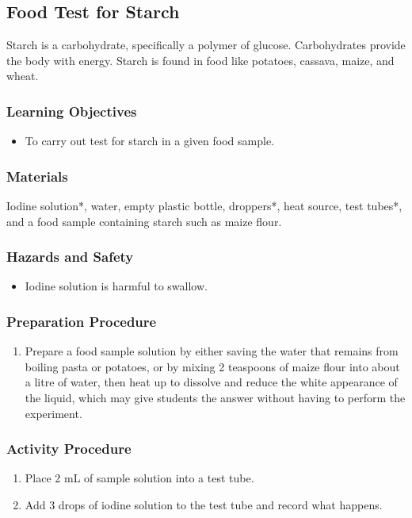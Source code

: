 \subsection{Food Test for Starch}
Starch is a carbohydrate, specifically a polymer of glucose. Carbohydrates provide the body with energy. Starch is found in food like potatoes, cassava, maize, and wheat.

\subsubsection*{Learning Objectives}
\begin{itemize}
\item{To carry out test for starch in a given food sample.}
\end{itemize}

\subsubsection*{Materials}
Iodine solution*, water, empty plastic bottle, droppers*, heat source, test tubes*, and a food sample containing starch such as maize flour.

\subsubsection*{Hazards and Safety}
\begin{itemize}
\item{Iodine solution is harmful to swallow.}
\end{itemize}

\subsubsection*{Preparation Procedure}
\begin{enumerate}
\item{Prepare a food sample solution by either saving the water that remains from boiling pasta or potatoes, or by mixing 2 teaspoons of maize flour into about a litre of water, then heat up to dissolve and reduce the white appearance of the liquid, which may give students the answer without having to perform the experiment.}
\end{enumerate}

\subsubsection*{Activity Procedure}
\begin{enumerate}
\item{Place 2 mL of sample solution into a test tube.}
\item{Add 3 drops of iodine solution to the test tube and record what happens.}
\end{enumerate}

